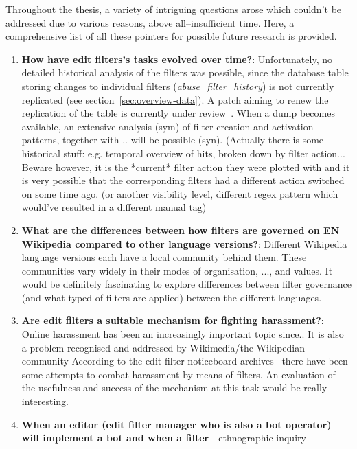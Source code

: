 Throughout the thesis, a variety of intriguing questions arose which couldn't be addressed due to various reasons, above all–insufficient time.
Here, a comprehensive list of all these pointers for possible future research is provided.

\begin{enumerate}
    \item \textbf{How have edit filters's tasks evolved over time?}: Unfortunately, no detailed historical analysis of the filters was possible, since the database table storing changes to individual filters (\emph{abuse\_filter\_history}) is not currently replicated (see section~\ref{sec:overview-data}). A patch aiming to renew the replication of the table is currently under review~\cite{gerrit-tables-replication}. When a dump becomes available, an extensive analysis (sym) of filter creation and activation patterns, together with .. will be possible (syn).
        (Actually there is some historical stuff: e.g. temporal overview of hits, broken down by filter action... Beware however, it is the *current* filter action they were plotted with and it is very possible that the corresponding filters had a different action switched on some time ago. %
        (or another visibility level, different regex pattern which would've resulted in a different manual tag)
    \item \textbf{What are the differences between how filters are governed on EN Wikipedia compared to other language versions?}: Different Wikipedia language versions each have a local community behind them. %
        These communities vary widely in their modes of organisation, ..., and values. It would be definitely fascinating to explore differences between filter governance (and what typed of filters are applied) between the different languages.
    \item \textbf{Are edit filters a suitable mechanism for fighting harassment?}: Online harassment has been an increasingly important topic since.. %
        It is also a problem recognised and addressed by Wikimedia/the Wikipedian community %
        According to the edit filter noticeboard archives~\cite{Wikipedia:EditFilterNoticeboardHarassment} there have been some attempts to combat harassment by means of filters.
        An evaluation of the usefulness and success of the mechanism at this task would be really interesting.
    \item \textbf{When an editor (edit filter manager who is also a bot operator) will implement a bot and when a filter} - ethnographic inquiry

\end{enumerate}
